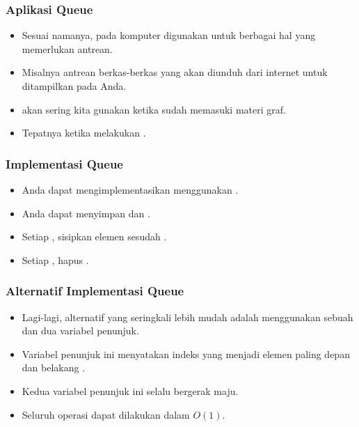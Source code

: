 \begin{frame}
\frametitle{Aplikasi Queue}
\begin{itemize}
  \item Sesuai namanya, pada komputer  digunakan untuk berbagai hal yang memerlukan antrean.
  \item Misalnya antrean berkas-berkas yang akan diunduh dari internet untuk ditampilkan pada  Anda.
  \item {} akan sering kita gunakan ketika sudah memasuki materi graf.
  \item Tepatnya ketika melakukan .
\end{itemize}
\end{frame}

\begin{frame}
\frametitle{Implementasi Queue}
\begin{itemize}
  \item Anda dapat mengimplementasikan  menggunakan .
  \item Anda dapat menyimpan   dan .
  \item Setiap , sisipkan elemen sesudah .
  \item Setiap , hapus  .
\end{itemize}
\end{frame}

\begin{frame}
\frametitle{Alternatif Implementasi Queue}
\begin{itemize}
  \item Lagi-lagi, alternatif yang seringkali lebih mudah adalah menggunakan sebuah  dan dua variabel penunjuk.
  \item Variabel penunjuk ini menyatakan indeks  yang menjadi elemen paling depan dan belakang .
  \item Kedua variabel penunjuk ini selalu bergerak maju.
  \item Seluruh operasi dapat dilakukan dalam $O(1)$.
\end{itemize}
\end{frame}

